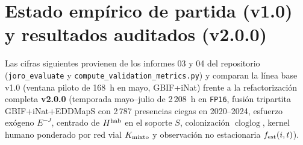 \documentclass[11pt,letterpaper]{article}
\newcommand{\cloglog}{\operatorname{cloglog}}
\begin{document}
\section{Estado empírico de partida (v1.0) y resultados auditados (v2.0.0)}
\label{sec:estado}
Las cifras siguientes provienen de los informes 03 y 04 del repositorio (\texttt{joro\_evaluate} y \texttt{compute\_validation\_metrics.py}) y comparan la línea base v1.0 (ventana piloto de 168~h en mayo, GBIF+iNat) frente a la refactorización completa \textbf{v2.0.0} (temporada mayo--julio de 2\,208~h en \texttt{FP16}, fusión tripartita GBIF+iNat+EDDMapS con 2\,787 presencias ciegas en 2020--2024, esfuerzo exógeno $E^{-J}$, centrado de $H^{\rm hab}$ en el soporte $S$, colonización $\cloglog$, kernel humano ponderado por red vial $K_{\rm mixto}$ y observación no estacionaria $f_{\rm est}(i,t)$).
\end{document}
